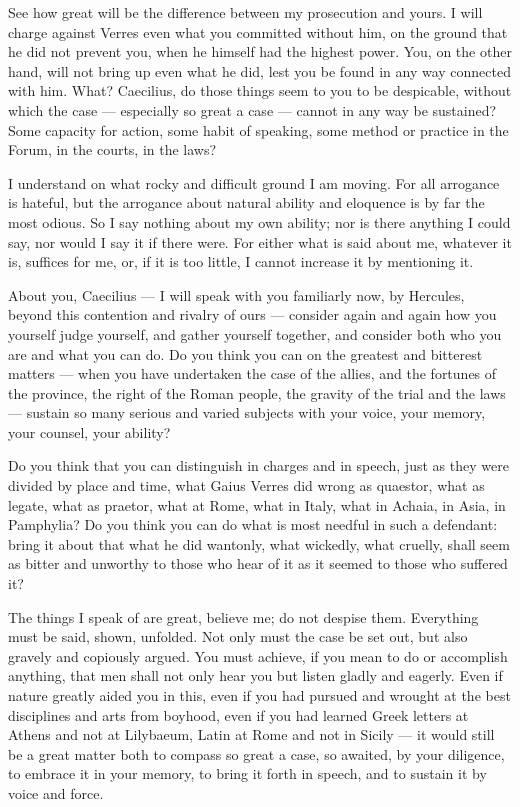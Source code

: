  See how great will be the difference between my prosecution and yours. I will charge against Verres even what you committed without him, on the ground that he did not prevent you, when he himself had the highest power. You, on the other hand, will not bring up even what he did, lest you be found in any way connected with him. What? Caecilius, do those things seem to you to be despicable, without which the case --- especially so great a case --- cannot in any way be sustained? Some capacity for action, some habit of speaking, some method or practice in the Forum, in the courts, in the laws?

 I understand on what rocky and difficult ground I am moving. For all arrogance is hateful, but the arrogance about natural ability and eloquence is by far the most odious. So I say nothing about my own ability; nor is there anything I could say, nor would I say it if there were. For either what is said about me, whatever it is, suffices for me, or, if it is too little, I cannot increase it by mentioning it.

 About you, Caecilius --- I will speak with you familiarly now, by Hercules, beyond this contention and rivalry of ours --- consider again and again how you yourself judge yourself, and gather yourself together, and consider both who you are and what you can do. Do you think you can on the greatest and bitterest matters --- when you have undertaken the case of the allies, and the fortunes of the province, the right of the Roman people, the gravity of the trial and the laws --- sustain so many serious and varied subjects with your voice, your memory, your counsel, your ability?

 Do you think that you can distinguish in charges and in speech, just as they were divided by place and time, what Gaius Verres did wrong as quaestor, what as legate, what as praetor, what at Rome, what in Italy, what in Achaia, in Asia, in Pamphylia? Do you think you can do what is most needful in such a defendant: bring it about that what he did wantonly, what wickedly, what cruelly, shall seem as bitter and unworthy to those who hear of it as it seemed to those who suffered it?

 The things I speak of are great, believe me; do not despise them. Everything must be said, shown, unfolded. Not only must the case be set out, but also gravely and copiously argued. You must achieve, if you mean to do or accomplish anything, that men shall not only hear you but listen gladly and eagerly. Even if nature greatly aided you in this, even if you had pursued and wrought at the best disciplines and arts from boyhood, even if you had learned Greek letters at Athens and not at Lilybaeum, Latin at Rome and not in Sicily --- it would still be a great matter both to compass so great a case, so awaited, by your diligence, to embrace it in your memory, to bring it forth in speech, and to sustain it by voice and force.

